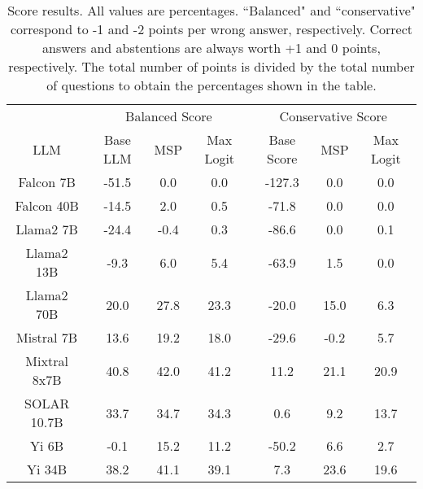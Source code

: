 \renewcommand\arraystretch{1.2}
\begin{table*}
\centering
\begin{tabular}{c|c|c|c|c|c|c}
& \multicolumn{3}{c|}{Balanced Score} & \multicolumn{3}{c}{Conservative Score} \\ 
LLM & Base LLM & MSP & Max Logit & Base Score & MSP & Max Logit\\ \hline
Falcon 7B & -51.5 & 0.0 & 0.0 & -127.3 & 0.0 & 0.0\\
Falcon 40B & -14.5 & 2.0 & 0.5 & -71.8 & 0.0 & 0.0\\
Llama2 7B & -24.4 & -0.4 & 0.3 & -86.6 & 0.0 & 0.1\\
Llama2 13B & -9.3 & 6.0 & 5.4 & -63.9 & 1.5 & 0.0\\
Llama2 70B & 20.0 & 27.8 & 23.3 & -20.0 & 15.0 & 6.3\\
Mistral 7B & 13.6 & 19.2 & 18.0 & -29.6 & -0.2 & 5.7\\
Mixtral 8x7B & 40.8 & 42.0 & 41.2 & 11.2 & 21.1 & 20.9\\
SOLAR 10.7B & 33.7 & 34.7 & 34.3 & 0.6 & 9.2 & 13.7\\
Yi 6B & -0.1 & 15.2 & 11.2 & -50.2 & 6.6 & 2.7\\
Yi 34B & 38.2 & 41.1 & 39.1 & 7.3 & 23.6 & 19.6\\
\hline
\end{tabular}
\caption{Score results. All values are percentages. ``Balanced" and ``conservative" correspond to -1 and -2 points per wrong answer, respectively. Correct answers and abstentions are always worth +1 and 0 points, respectively. The total number of points is divided by the total number of questions to obtain the percentages shown in the table.}
\label{tab:score}
\end{table*}
